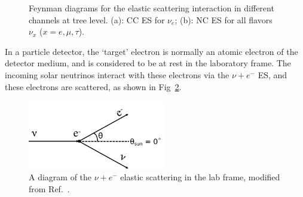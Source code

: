\begin{figure}[htbp]
	\centering
	\caption[Feynman diagrams for the elastic scattering interaction at tree level.]{Feynman diagrams for the elastic scattering interaction in different channels at tree level. (a): CC ES for $\nu_e$; (b): NC ES for all flavors $\nu_x$ ($x=e,\mu,\tau$).\label{fig:feynman-es}}
\end{figure}


In a particle detector, the `target' electron is normally an atomic electron of the detector medium, and is considered to be at rest in the laboratory frame. The incoming solar neutrinos interact with these electrons via the $\nu+e^-$ ES, and these electrons are scattered, as shown in Fig~\ref{fig:ESdiagram}. 

\begin{figure}[htbp]
	\centering	
	\includegraphics[width=6cm]{ElasticScatteringCartoon.png}
	\caption[A diagram of the $\nu + e^-$ elastic scattering in the lab frame.]{A diagram of the $\nu + e^-$ elastic scattering in the lab frame, modified from Ref.~\cite{giunti2007fundamentals}.	\label{fig:ESdiagram}}
\end{figure}

